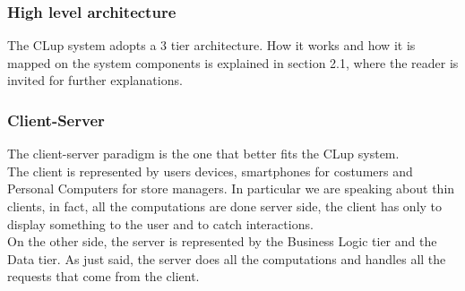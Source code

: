 \documentclass[]{article}
\begin{document}
	\subsubsection{High level architecture}
	The CLup system adopts a 3 tier architecture. 
	How it works and how it is mapped on the system components is explained in section 2.1, where the reader is invited for further explanations.
	
	\subsubsection{Client-Server}
	The client-server paradigm is the one that better fits the CLup system.
	\\The client is represented by users devices, smartphones for costumers and Personal Computers for store managers. In particular we are speaking about thin clients, in fact, all the computations are done server side, the client has only to display something to the user and to catch interactions.
	\\On the other side, the server is represented by the Business Logic tier and the Data tier. As just said, the server does all the computations and handles all the requests that come from the client. 
	
\end{document}
